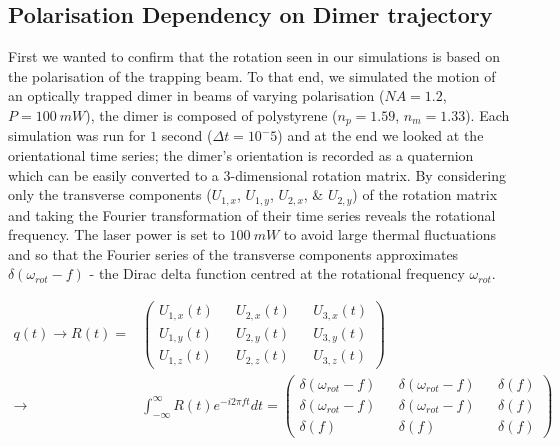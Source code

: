 \subsection{Polarisation Dependency on Dimer trajectory}
First we wanted to confirm that the rotation seen in our simulations is
based on the polarisation of the trapping beam. To that end, we simulated 
the motion of an optically trapped dimer in beams of varying polarisation 
($NA=1.2$, $P=100\ mW$), the dimer is composed of polystyrene ($n_p=1.59$, 
$n_m=1.33$). Each simulation was run for $1$ second ($\Delta t =10^-5$) 
and at the end we looked at the orientational time series; the dimer's 
orientation is recorded as a quaternion which can be easily converted to 
a 3-dimensional rotation matrix. By considering only the transverse 
components ($U_{1,x}$, $U_{1,y}$, $U_{2,x}$, \& $U_{2,y}$) of the rotation 
matrix and taking the Fourier transformation of their time series reveals 
the rotational frequency. The laser power is set to $100\ mW$ to avoid 
large thermal fluctuations and so that the Fourier series of the transverse 
components approximates $\delta(\omega_{rot}-f)$ - the Dirac delta function 
centred at the rotational frequency $\omega_{rot}$.

\begin{equation}
	\begin{split}
		q(t) \rightarrow R(t) =& 
		\begin{pmatrix}
			U_{1,x}(t) && U_{2,x}(t) && U_{3,x}(t) \\
			U_{1,y}(t) && U_{2,y}(t) && U_{3,y}(t) \\
			U_{1,z}(t) && U_{2,z}(t) && U_{3,z}(t) 
		\end{pmatrix} \\
		\rightarrow
		&\int^\infty_{-\infty}R(t)e^{-i2\pi ft} dt = 
		\begin{pmatrix}
			\delta(\omega_{rot}-f) && \delta(\omega_{rot}-f) && \delta(f) \\
			\delta(\omega_{rot}-f) && \delta(\omega_{rot}-f) && \delta(f)\\
			\delta(f) && \delta(f) && \delta(f)
		\end{pmatrix}
	\end{split}
\end{equation}

